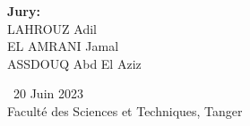 \begin{titlepage}
\begin{center}
\large
\textbf{Jury:}\\
LAHROUZ Adil\\
EL AMRANI Jamal\\
ASSDOUQ Abd El Aziz\\
\end{center}

\vspace{24mm}

\begin{center}
\large \ 20 Juin 2023\\
Faculté des Sciences et Techniques, Tanger
\end{center}
\end{titlepage}
\restoregeometry
